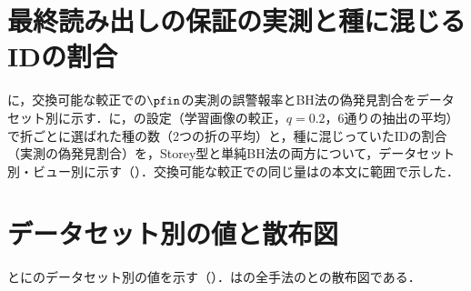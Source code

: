\section{最終読み出しの保証の実測と種に混じるIDの割合}
\label{sec:app_fdp}


に，交換可能な較正での$\pfin$の実測の誤警報率とBH法の偽発見割合をデータセット別に示す．に，の設定（学習画像の較正，$q{=}0.2$，6通りの抽出の平均）で折ごとに選ばれた種の数（2つの折の平均）と，種に混じっていたIDの割合（実測の偽発見割合）を，Storey型と単純BH法の両方について，データセット別・ビュー別に示す（）．交換可能な較正での同じ量はの本文に範囲で示した．

\begin{table}[t]
\centering
\caption{最終スコア$\pfin$の保証の実測（交換可能な較正：IDの検証画像からクラスあたり4枚を較正画像とし，\NVcalNSplits{}通りの抽出の平均，単体）．IDの誤警報率は$\pfin\le\alpha$と判定されたIDのテスト画像の割合（命題4(i)：$\le\alpha$），偽発見割合はBH法（$q{=}0.2$）で棄却された画像のうちIDの割合（命題4(ii)：期待値$\le0.2$），再現率は未知のうち棄却された割合．}
\label{tab:val}
\vspace{1.5mm}

\end{table}

\begin{table}[t]
\centering
\caption{学習画像の較正で選ばれた種（折あたり，6通りの抽出の平均）．種は種の数，ID率は種に混じっていたIDの割合（実測の偽発見割合，水準$q{=}0.2$）．}
\label{tab:fdp}
\vspace{1.5mm}

\end{table}

\section{データセット別の値と散布図}
\label{sec:app_four}
とにのデータセット別の値を示す（）．はの全手法の\AUC{}と\FPR{}の散布図である．

\begin{table}[t]
\centering
\caption{OpenOOD v1.5 ImageNet-1Kのデータセット別の結果（[\%]，AUROC$\uparrow$／FPR95$\downarrow$）．記法はと同じ．TINSの報告値は原論文の表8のとおりで，iNaturalistとTexturesは同論文のFour-OODの表1と同じ値が報告されている（）．}
\label{tab:perds}
\vspace{1.5mm}

\end{table}


